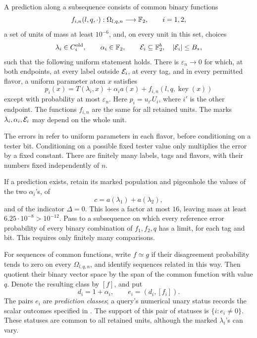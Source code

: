 \begin{definition}
\label{def:prediction}
A prediction along a subsequence consists of common binary
functions
\[
 f_{i,n}(l,q,\cdot):\Omega_{l,q,n}\longrightarrow\mathbb F_2,
 \qquad i=1,2,
\]
a set of units of mass at least \(10^{-6}\), and, on every
unit in this set, choices
\[
 \lambda_i\in C_i^{\mathrm{old}},\qquad
 \alpha_i\in\mathbb F_2,\qquad
 {\cal E}_i\subseteq\mathbb F_2^b,\quad |{\cal E}_i|\le B_*,
\]
such that the following uniform statement holds.  There is
\(\varepsilon_n\to0\) for which, at both endpoints, at every
label outside \({\cal E}_i\), at every tag, and in every
permitted flavor, a uniform parameter atom \(x\) satisfies
\begin{equation}
 p_i(x)=T(\lambda_i,x)+\alpha_i a(x)
          +f_{i,n}(l,q,\operatorname{key}(x))
 \label{eq:prediction}
\end{equation}
except with probability at most \(\varepsilon_n\).
Here \(p_i=u_{i'}U_i\), where \(i'\) is the other endpoint.
The functions \(f_{i,n}\) are the same for all retained units.
The marks \(\lambda_i,\alpha_i,{\cal E}_i\) may depend on
the whole unit.
\end{definition}

The errors in  refer to uniform parameters
in each flavor, before conditioning on a tester bit.  Conditioning
on a possible fixed tester value only multiplies the error by a
fixed constant.  There are finitely many labels, tags and flavors,
with their numbers fixed independently of \(n\).

If a prediction exists, retain its marked population and
pigeonhole the values of the two \(\alpha_i\)'s, of
\[
 c=a(\lambda_1)+a(\lambda_2),
\]
and of the indicator \(\Delta=0\).
This loses a factor at most \(16\), leaving mass at least
\(6.25\cdot10^{-8}>10^{-12}\).
Pass to a subsequence on which every reference error probability
of every binary combination of \(f_1,f_2,q\) has a limit, for
each tag and bit.  This requires only finitely many comparisons.

For sequences of common functions, write \(f\simeq g\) if their
disagreement probability tends to zero on every
\(\Omega_{l,q,n}\), and identify sequences related in this way.
Then quotient their binary vector space by the span of the common
function with value \(q\).
Denote the resulting class by \([f]\), and put
\begin{equation}
 d_i=1+\alpha_i,\qquad e_i=(d_i,[f_i]).
 \label{eq:status-class}
\end{equation}
The pairs \(e_i\) are \emph{prediction classes}; a query's numerical
unary status records the scalar outcomes specified in
.
The support of this pair of statuses is
\(\{i:e_i\ne0\}\).  These statuses are common to all retained
units, although the marked \(\lambda_i\)'s can vary.

